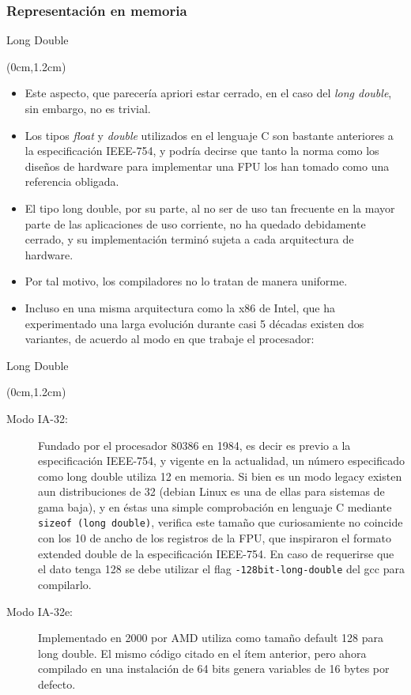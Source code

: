\documentclass[usenames,table,dvipsnames,aspectratio=169]{beamer}
\begin{document}
\subsubsection{Representación en memoria}
\begin{frame}{Long Double}
 \begin{textblock*}{\textwidth}(0cm,1.2cm)
  \begin{itemize} [<+->]\justifying \parskip .15cm
   \item Este aspecto, que parecería apriori estar cerrado, en el caso del \textit{long double}, sin embargo, no es trivial.
   \item Los tipos \textit{float} y \textit{double} utilizados en el lenguaje C son bastante anteriores a la especificación IEEE-754, y podría decirse que tanto la norma como los diseños de hardware para implementar una FPU los han tomado como una referencia obligada.
   \item El tipo long double, por su parte, al no ser de uso tan frecuente en la mayor parte de las aplicaciones de uso corriente, no ha quedado debidamente cerrado, y su implementación terminó sujeta a cada arquitectura de hardware.
   \item Por tal motivo, los compiladores no lo tratan de manera uniforme.
   \item Incluso en una misma arquitectura como la x86 de Intel, que ha experimentado una larga evolución durante casi 5 décadas existen dos variantes, de acuerdo al modo en que trabaje el procesador:
  \end{itemize}
 \end{textblock*}
\end{frame}

\begin{frame}{Long Double}
 \begin{textblock*}{\textwidth}(0cm,1.2cm)
  \begin{description}
   \item [Modo IA-32:] Fundado por el procesador 80386 en 1984, es decir es previo a la especificación IEEE-754,  y vigente en la actualidad, un número especificado como long double utiliza \SI{12}{\byte} en memoria. Si bien es un modo legacy existen aun distribuciones de \SI{32}{\bit} (debian Linux es una de ellas para sistemas de gama baja), y en éstas una simple comprobación en lenguaje C mediante \texttt{sizeof (long double)}, verifica este tamaño que curiosamiente no coincide con los \SI{10}{\byte} de ancho de los registros de la FPU, que inspiraron el formato extended double de la especificación IEEE-754. En caso de requerirse que el dato tenga \SI{128}{\bit} se debe utilizar el flag \texttt{-128bit-long-double} del gcc para compilarlo.
   \item [Modo IA-32e:] Implementado en 2000 por AMD utiliza como tamaño default \SI{128}{\bit} para long double. El mismo código citado en el ítem anterior, pero ahora compilado en una instalación de 64 bits genera variables de 16 bytes por defecto.
  \end{description}
 \end{textblock*}
\end{frame}
\end{document}
